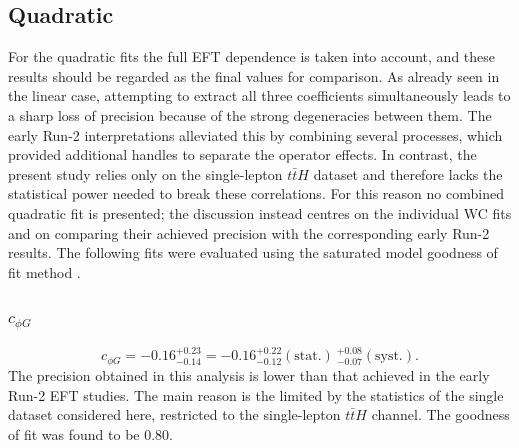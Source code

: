 \subsection{Quadratic}
For the quadratic fits the full EFT dependence is taken into account, and these results should be regarded as the final values for comparison. As already seen in the linear case, attempting to extract all three coefficients simultaneously leads to a sharp loss of precision because of the strong degeneracies between them. The early Run-2 interpretations alleviated this by combining several processes, which provided additional handles to separate the operator effects. In contrast, the present study relies only on the single-lepton $t\bar{t}H$ dataset and therefore lacks the statistical power needed to break these correlations. For this reason no combined quadratic fit is presented; the discussion instead centres on the individual WC fits and on comparing their achieved precision with the corresponding early Run-2 results. The following fits were evaluated using the saturated model goodness of fit method \cite{Buckley2022}.
 
\subsubsection{$c_{\phi G}$}

\begin{equation}
    c_{\phi G} = -0.16^{+0.23}_{-0.14}=-0.16^{+0.22}_{-0.12} (\text{stat.})~^{+0.08}_{-0.07} (\text{syst.}). 
\end{equation}
The precision obtained in this analysis is lower than that achieved in the early Run-2 EFT studies. The main reason is the limited by the statistics of the single dataset considered here, restricted to the single-lepton $t\bar{t}H$ channel. The goodness of fit was found to be 0.80.

